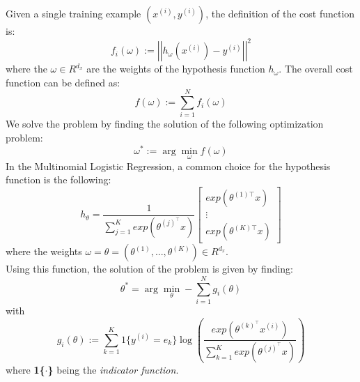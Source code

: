 \documentclass[a4paper,11pt,oneside]{book}
\begin{document}
Given a single training example $(x^{(i)}, y^{(i)})$, the definition of the cost function is:
\begin{equation}
f_i\left(\omega\right):=\left|\left|h_\omega\left(x^{(i)}\right)-y^{(i)}\right|\right|^2
\end{equation}
where the $\omega \in R^{d_{x}}$ are the weights of the hypothesis function $h_{\omega}$. The overall cost function can be defined as:
\begin{equation}
f\left(\omega\right):=\sum_{i=1}^{N}{f_i\left(\omega\right)}
\end{equation}
We solve the problem by finding the solution of the following optimization problem:
\begin{equation}
\omega^*:=\arg\min_\omega f\left(\omega\right)
\end{equation}
In the Multinomial Logistic Regression, a common choice for the hypothesis function is the following:
\begin{equation}
h_\theta=\frac{1}{\sum_{j=1}^{K}{exp\left(\theta^{(j)^\top}x\right)}}\begin{bmatrix}exp\left(\theta^{(1)\top}x\right)  \\ \vdots \\ exp\left(\theta^{(K)\top}x\right) \end{bmatrix}
\end{equation}
where the weights $\omega = \theta = (\theta^{(1)}, ..., \theta^{(K)}) \in R^{d_{x}}$. \\
Using this function, the solution of the problem is given by finding:
\begin{equation}\label{EQ1.7}
\theta^*=\arg\min_\theta -\sum_{i=1}^{N}{g_i(\theta)}
\end{equation}
with
\begin{equation} \label{EQ1.8}
g_i\left(\theta\right):=\sum_{k=1}^{K}{1\{y^{(i)}=e_k\}\log{\left( \frac{exp(\theta^{(k)^\top}x^{(i)})}{\sum_{k=1}^{K}{exp( \theta^{(j)^\top}x )}} \right)}}
\end{equation}
where \textbf{1\{$\cdot$\}} being the \textit{indicator function}.\cite{CITATION:2}
\end{document}

